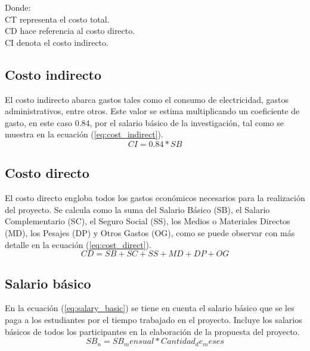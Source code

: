 Donde: \\
CT representa el costo total. \\
CD hace referencia al costo directo. \\
CI denota el costo indirecto.

\subsection{Costo indirecto}

El costo indirecto abarca gastos tales como el consumo de electricidad, gastos administrativos, entre otros. Este valor se estima multiplicando un coeficiente de gasto, en este caso 0.84, por el salario básico de la investigación, tal como se muestra en la ecuación (\ref{eq:cost_indirect}). \\

\begin{equation}
    \label{eq:cost_indirect}
    CI = 0.84 * SB
\end{equation}

\subsection{Costo directo}

El costo directo engloba todos los gastos económicos necesarios para la realización del proyecto. Se calcula como la suma del Salario Básico (SB), el Salario Complementario (SC), el Seguro Social (SS), los Medios o Materiales Directos (MD), los Pesajes (DP) y Otros Gastos (OG), como se puede observar con más detalle en la ecuación (\ref{eq:cost_direct}). \\

\begin{equation}
    \label{eq:cost_direct}
    CD = SB + SC + SS + MD + DP + OG
\end{equation}

\subsection{Salario básico}

En la ecuación (\ref{eq:salary_basic}) se tiene en cuenta el salario básico que se les paga a los estudiantes por el tiempo trabajado en el proyecto. Incluye los salarios básicos de todos los participantes en la elaboración de la propuesta del proyecto. \\

\begin{equation}
    \label{eq:salary_basic}
    SB_n = SB_mensual * Cantidad_de_meses
\end{equation}

